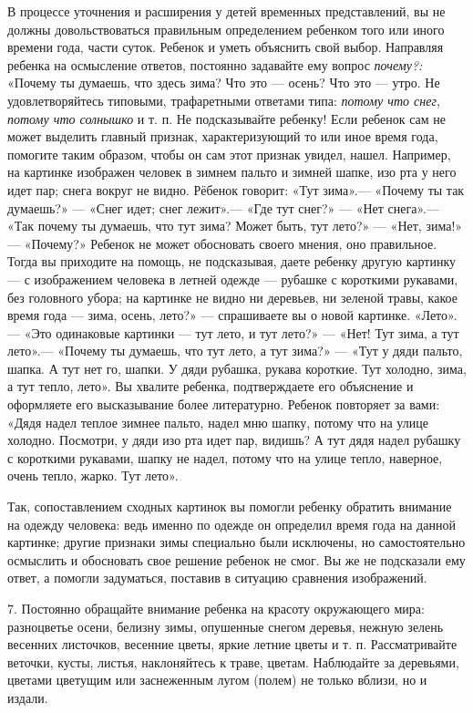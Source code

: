 \documentclass[a5paper]{book}
\renewcommand{\emph}[1]{\textit{#1}}
\begin{document}
В процессе уточнения и расширения у детей временных представлений, вы не
должны довольствоваться правильным определением ребенком того или иного
времени года, части суток. Ребенок и уметь объяснить свой выбор.
Направляя ребенка на осмысление ответов, постоянно задавайте ему вопрос
\emph{почему?:} «Почему ты думаешь, что здесь зима? Что это --- осень?
Что это --- утро. Не удовлетворяйтесь типовыми, трафаретными ответами
типа: \emph{потому что снег, потому что солнышко} и т. п. Не
подсказывайте ребенку! Если ребенок сам не может выделить главный
признак, характеризующий то или иное время года, помогите таким образом,
чтобы он сам этот признак увидел, нашел. Например, на картинке изображен
человек в зимнем пальто и зимней шапке, изо рта у него идет пар; снега
вокруг не видно. Рёбенок говорит: «Тут зима».--- «Почему ты так
думаешь?» --- «Снег идет; снег лежит».--- «Где тут снег?» --- «Нет
снега».--- «Так почему ты думаешь, что тут зима? Может быть, тут лето?»
--- «Нет, зима!» --- «Почему?» Ребенок не может обосновать своего
мнения, оно правильное. Тогда вы приходите на помощь, не подсказывая,
даете ребенку другую картинку --- с изображением человека в летней
одежде --- рубашке с короткими рукавами, без головного убора; на
картинке не видно ни деревьев, ни зеленой травы, какое время года ---
зима, осень, лето?» --- спрашиваете вы о новой картинке. «Лето».--- «Это
одинаковые картинки --- тут лето, и тут лето?» --- «Нет! Тут зима, а тут
лето».--- «Почему ты думаешь, что тут лето, а тут зима?» --- «Тут у дяди
пальто, шапка. А тут нет го, шапки. У дяди рубашка, рукава короткие. Тут
холодно, зима, а тут тепло, лето». Вы хвалите ребенка, подтверждаете его
объяснение и оформляете его высказывание более литературно. Ребенок
повторяет за вами: «Дядя надел теплое зимнее пальто, надел мню шапку,
потому что на улице холодно. Посмотри, у дяди изо рта идет пар, видишь?
А тут дядя надел рубашку с короткими рукавами, шапку не надел, потому
что на улице тепло, наверное, очень тепло, жарко. Тут лето».

Так, сопоставлением сходных картинок вы помогли ребенку обратить
внимание на одежду человека: ведь именно по одежде он определил время
года на данной картинке; другие признаки зимы специально были исключены,
но самостоятельно осмыслить и обосновать свое решение ребенок не смог.
Вы же не подсказали ему ответ, а помогли задуматься, поставив в ситуацию
сравнения изображений.

7. Постоянно обращайте внимание ребенка на красоту окружающего мира:
разноцветье осени, белизну зимы, опушенные снегом деревья, нежную зелень
весенних листочков, весенние цветы, яркие летние цветы и т. п.
Рассматривайте веточки, кусты, листья, наклоняйтесь к траве, цветам.
Наблюдайте за деревьями, цветами цветущим или заснеженным лугом (полем)
не только вблизи, но и издали.
\end{document}

